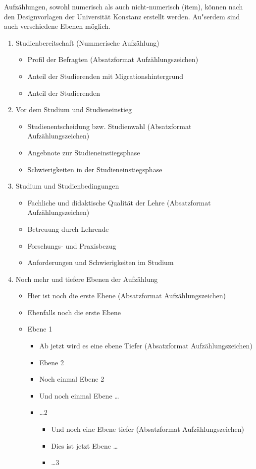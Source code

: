 Aufzählungen, sowohl numerisch als auch nicht-numerisch (item), können nach den Designvorlagen der Universität Konstanz erstellt werden. Au"serdem sind auch verschiedene Ebenen möglich.\\

\begin{enumerate}
\item Studienbereitschaft (Nummerische Aufzählung)

\begin{itemize}
\item Profil der Befragten (Absatzformat Aufzählungszeichen)
\item Anteil der Studierenden mit Migrationshintergrund
\item Anteil der Studierenden
\end{itemize}

\item Vor dem Studium und Studieneinstieg
\begin{itemize}
\item Studienentscheidung bzw. Studienwahl (Absatzformat Aufzählungszeichen)
\item Angebnote zur Studieneinstiegsphase
\item Schwierigkeiten in der Studieneinstiegsphase
\end{itemize}

\item Studium und Studienbedingungen
\begin{itemize}
\item Fachliche und didaktische Qualität der Lehre (Absatzformat Aufzählungszeichen)
\item Betreuung durch Lehrende
\item Forschungs- und Praxisbezug
\item Anforderungen und Schwierigkeiten im Studium
\end{itemize}

\item Noch mehr und tiefere Ebenen der Aufzählung

\begin{itemize}
\item Hier ist noch die erste Ebene (Absatzformat Aufzählungszeichen)
\item Ebenfalls noch die erste Ebene
\item Ebene 1
\begin{itemize}
\item Ab jetzt wird es eine ebene Tiefer (Absatzformat Aufzählungszeichen)
\item Ebene 2
\item Noch einmal Ebene 2
\item Und noch einmal Ebene \ldots
\item \ldots 2
\begin{itemize}
\item Und noch eine Ebene tiefer (Absatzformat Aufzählungszeichen)
\item Dies ist jetzt Ebene \ldots
\item \ldots 3
\end{itemize}
\end{itemize}
\end{itemize}


\end{enumerate}
